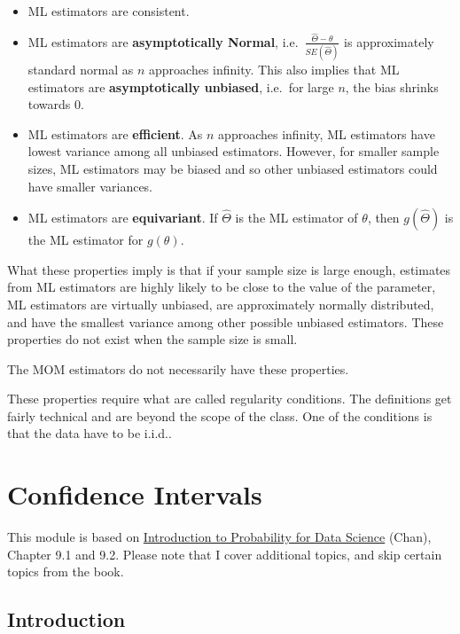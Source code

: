 \documentclass[
]{book}
\providecommand{\tightlist}{%
  \setlength{\itemsep}{0pt}\setlength{\parskip}{0pt}}
\begin{document}
\begin{itemize}
\tightlist
\item
  ML estimators are consistent.
\item
  ML estimators are \textbf{asymptotically Normal}, i.e.~\(\frac{\hat{\Theta} - \theta}{SE(\hat{\Theta})}\) is approximately standard normal as \(n\) approaches infinity. This also implies that ML estimators are \textbf{asymptotically unbiased}, i.e.~for large \(n\), the bias shrinks towards 0.
\item
  ML estimators are \textbf{efficient}. As \(n\) approaches infinity, ML estimators have lowest variance among all unbiased estimators. However, for smaller sample sizes, ML estimators may be biased and so other unbiased estimators could have smaller variances.
\item
  ML estimators are \textbf{equivariant}. If \(\hat{\Theta}\) is the ML estimator of \(\theta\), then \(g(\hat{\Theta})\) is the ML estimator for \(g(\theta)\).
\end{itemize}

What these properties imply is that if your sample size is large enough, estimates from ML estimators are highly likely to be close to the value of the parameter, ML estimators are virtually unbiased, are approximately normally distributed, and have the smallest variance among other possible unbiased estimators. These properties do not exist when the sample size is small.

The MOM estimators do not necessarily have these properties.

These properties require what are called regularity conditions. The definitions get fairly technical and are beyond the scope of the class. One of the conditions is that the data have to be i.i.d..

\hypertarget{confidence-intervals}{%
\chapter{Confidence Intervals}\label{confidence-intervals}}

This module is based on \href{https://probability4datascience.com}{Introduction to Probability for Data Science} (Chan), Chapter 9.1 and 9.2. Please note that I cover additional topics, and skip certain topics from the book.

\hypertarget{introduction-4}{%
\section{Introduction}\label{introduction-4}}
\end{document}
